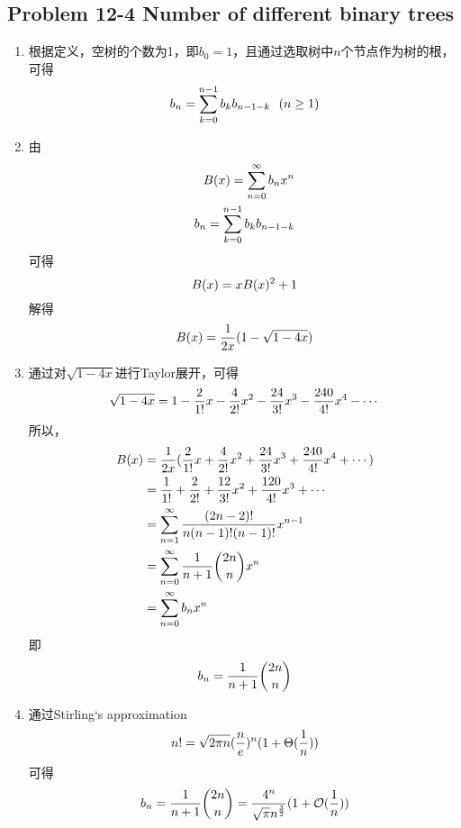 \subsection*{Problem 12-4 Number of different binary trees}
\begin{enumerate}
	\item	根据定义，空树的个数为1，即$b_0 = 1$，且通过选取树中$n$个节点作为树的根，可得
		\begin{equation} \notag
			b_n = \sum_{k = 0}^{n - 1} b_k b_{n - 1 - k} \ \ (n \geq 1)
		\end{equation}
	\item	由
		\begin{equation} \notag
		\begin{aligned}
			B(x) = \sum_{n = 0}^{\infty} b_n x^n \\
			b_n = \sum_{k = 0}^{n - 1} b_k b_{n - 1 - k}
		\end{aligned}
		\end{equation}
		可得
		\begin{equation} \notag
			B(x) = xB(x)^2 + 1
		\end{equation}
		解得
		\begin{equation} \notag
			B(x) = \frac{1}{2x} (1 - \sqrt{1 - 4x})
		\end{equation}
	\item	通过对$\sqrt{1 - 4x}$进行Taylor展开，可得 \\ 
		\begin{equation} \notag
			\sqrt{1 - 4x} = 1 - \frac{2}{1!}x - \frac{4}{2!}x^2 - \frac{24}{3!}x^3 - \frac{240}{4!}x^4 - \cdots
		\end{equation}
		所以，
		\begin{equation} \notag
		\begin{aligned}
			B(x) & = \frac{1}{2x}(\frac{2}{1!}x + \frac{4}{2!}x^2 + \frac{24}{3!}x^3 + \frac{240}{4!}x^4 + \cdots) \\
				& = \frac{1}{1!} + \frac{2}{2!} + \frac{12}{3!}x^2 + \frac{120}{4!}x^3 + \cdots \\
				& = \sum_{n = 1}^{\infty} \frac{(2n - 2)!}{n(n - 1)!(n - 1)!} x^{n - 1} \\
				& = \sum_{n = 0}^{\infty} \frac{1}{n + 1} \binom{2n}{n} x^n \\
				& = \sum_{n = 0}^{\infty} b_n x^n
		\end{aligned}
		\end{equation}
		即
		\begin{equation} \notag
			b_n = \frac{1}{n + 1} \binom{2n}{n}
		\end{equation}
	\item	通过Stirling‘s approximation
		\begin{equation} \notag
			n! = \sqrt{2 \pi n}(\frac{n}{e})^n(1 + \Theta(\frac{1}{n}))
		\end{equation}
		可得
		\begin{equation} \notag
			b_n = \frac{1}{n + 1} \binom{2n}{n} = \frac{4^n}{\sqrt{\pi}n^{\frac{3}{2}}}(1 + \mathcal{O}(\frac{1}{n}))
		\end{equation}
\end{enumerate}

